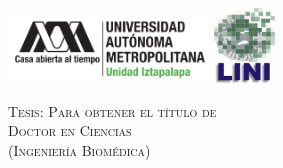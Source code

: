 
\begin{titlepage}

\begin{minipage}{\textwidth}
  \vspace{-3cm}
  \hspace{-2em}
     \includegraphics[width=0.4\textwidth ]{../images/uam-izt-v6}
  \hspace{19em}
     \includegraphics[width=0.12\textwidth]{../images/lini-v1}
\end{minipage}

\begin{center}
	\vspace{0.1cm}

	\begin{minipage}{0.9\textwidth}
		\centering
		\textsc{Tesis: Para obtener el título de\\ Doctor en Ciencias \\(Ingeniería Biomédica)}
		\vspace{1em}
   \end{minipage}

   \begin{minipage}{.8\textwidth}
      \centering
		\HRule \\[0.3cm]
		\\
		\HRule
   \end{minipage}
		

\end{center}
\end{titlepage}
